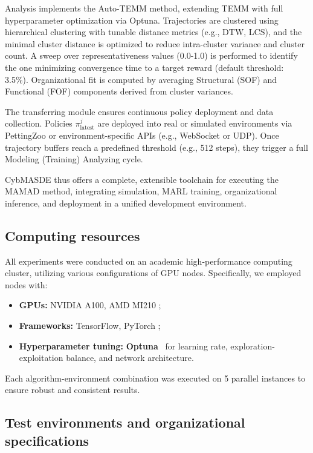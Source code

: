 \documentclass[pdflatex,sn-mathphys-num]{sn-jnl}%
\theoremstyle{thmstyleone}%
\theoremstyle{thmstyletwo}%
\theoremstyle{thmstylethree}%
\begin{document}
Analysis implements the Auto-TEMM method, extending TEMM with full hyperparameter optimization via Optuna. Trajectories are clustered using hierarchical clustering with tunable distance metrics (e.g., DTW, LCS), and the minimal cluster distance is optimized to reduce intra-cluster variance and cluster count. A sweep over representativeness values (0.0-1.0) is performed to identify the one minimizing convergence time to a target reward (default threshold: 3.5\%). Organizational fit is computed by averaging Structural (SOF) and Functional (FOF) components derived from cluster variances.

The transferring module ensures continuous policy deployment and data collection. Policies $\pi^j_{\text{latest}}$ are deployed into real or simulated environments via PettingZoo or environment-specific APIs (e.g., WebSocket or UDP). Once trajectory buffers reach a predefined threshold (e.g., 512 steps), they trigger a full Modeling (Training) Analyzing cycle.

CybMASDE thus offers a complete, extensible toolchain for executing the MAMAD method, integrating simulation, MARL training, organizational inference, and deployment in a unified development environment.



\subsection{Computing resources}

All experiments were conducted on an academic high-performance computing cluster, utilizing various configurations of GPU nodes. Specifically, we employed nodes with:
\begin{itemize}
    \item \textbf{GPUs:} NVIDIA A100, AMD MI210 ;
    \item \textbf{Frameworks:} TensorFlow, PyTorch ;
    \item \textbf{Hyperparameter tuning:} \textbf{Optuna}~\cite{akiba2019optuna} for learning rate, exploration-exploitation balance, and network architecture.
\end{itemize}

Each algorithm-environment combination was executed on 5 parallel instances to ensure robust and consistent results.

\subsection{Test environments and organizational specifications}
\end{document}
